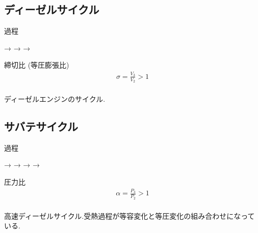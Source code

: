 \documentclass[a4paper]{jsarticle}
\begin{document}
\subsection{ディーゼルサイクル}
\begin{itembox}[l]{過程}
    \begin{center}
        \quad → \quad {} \quad → \quad {} \quad → \quad {}
    \end{center}
\end{itembox}
\begin{itembox}[l]{締切比 (等圧膨張比)}
    \begin{eqnarray*}
        \sigma=\frac{V_3}{V_2}>1\\
    \end{eqnarray*}
\end{itembox}
ディーゼルエンジンのサイクル.
\subsection{サバテサイクル}
\begin{itembox}[l]{過程}
    \begin{center}
        \quad → \quad {}\quad → \quad {} \quad → \quad {} \quad → \quad {}
    \end{center}
\end{itembox}
\begin{itembox}[l]{圧力比}
    \begin{eqnarray*}
        \alpha=\frac{P_3}{P_2}>1\\
    \end{eqnarray*}
\end{itembox}
高速ディーゼルサイクル.受熱過程が等容変化と等圧変化の組み合わせになっている.
\end{document}
